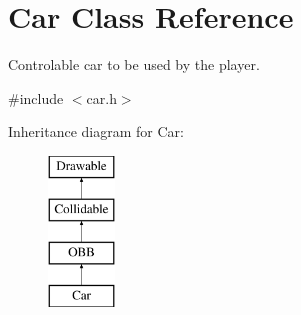 \hypertarget{class_car}{}\section{Car Class Reference}
\label{class_car}


Controlable car to be used by the player.  




{\ttfamily \#include $<$car.\+h$>$}

Inheritance diagram for Car\+:\begin{figure}[H]
\begin{center}
\leavevmode
\includegraphics[height=4.000000cm]{class_car}
\end{center}
\end{figure}
